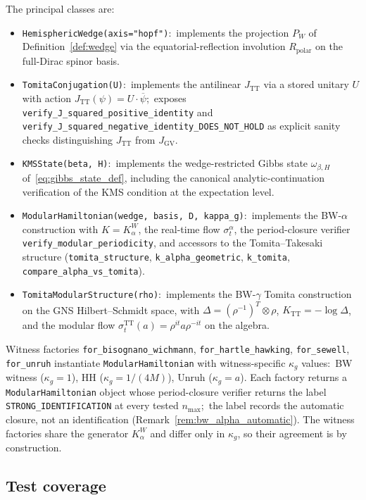 \documentclass[11pt,a4paper]{article}
\theoremstyle{plain}
\theoremstyle{definition}
\newcommand{\nmax}{n_{\max}}
\newcommand{\TT}{\mathrm{TT}}
\begin{document}
The principal classes are:
\begin{itemize}\setlength{\itemsep}{2pt}
\item \texttt{HemisphericWedge(axis="hopf")}:\ implements the projection
$P_W$ of Definition~\ref{def:wedge} via the equatorial-reflection
involution $R_{\mathrm{polar}}$ on the full-Dirac spinor basis.
\item \texttt{TomitaConjugation(U)}:\ implements the antilinear
$J_{\TT}$ via a stored unitary $U$ with action
$J_{\TT}(\psi) = U \cdot \overline{\psi}$;\ exposes
\texttt{verify\_J\_squared\_positive\_identity} and
\texttt{verify\_J\_squared\_negative\_identity\_DOES\_NOT\_HOLD} as
explicit sanity checks distinguishing $J_{\TT}$ from
$J_{\mathrm{GV}}$.
\item \texttt{KMSState(beta, H)}:\ implements the wedge-restricted
Gibbs state $\omega_{\beta, H}$ of~\eqref{eq:gibbs_state_def},
including the canonical analytic-continuation verification of the
KMS condition at the expectation level.
\item \texttt{ModularHamiltonian(wedge, basis, D, kappa\_g)}:\
implements the BW-$\alpha$ construction with $K = K_\alpha^W$, the
real-time flow $\sigma_t^{\alpha}$, the period-closure verifier
\texttt{verify\_modular\_periodicity}, and accessors to the
Tomita--Takesaki structure (\texttt{tomita\_structure},
\texttt{k\_alpha\_geometric}, \texttt{k\_tomita},
\texttt{compare\_alpha\_vs\_tomita}).
\item \texttt{TomitaModularStructure(rho)}:\ implements the
BW-$\gamma$ Tomita construction on the GNS Hilbert--Schmidt space,
with $\Delta = (\rho^{-1})^T \otimes \rho$, $K_{\TT} = -\log \Delta$,
and the modular flow $\sigma_t^{\TT}(a) = \rho^{it} a \rho^{-it}$ on
the algebra.
\end{itemize}
Witness factories \texttt{for\_bisognano\_wichmann},
\texttt{for\_hartle\_hawking}, \texttt{for\_sewell},
\texttt{for\_unruh} instantiate
\texttt{ModularHamiltonian} with witness-specific $\kappa_g$ values:\
BW witness ($\kappa_g = 1$), HH ($\kappa_g = 1/(4M)$),
Unruh ($\kappa_g = a$). Each factory returns a
\texttt{ModularHamiltonian} object whose period-closure verifier
returns the label \texttt{STRONG\_IDENTIFICATION} at every tested
$\nmax$;\ the label records the automatic closure, not an
identification (Remark~\ref{rem:bw_alpha_automatic}).  The witness
factories share the generator $K_\alpha^W$ and differ only in
$\kappa_g$, so their agreement is by construction.

\subsection{Test coverage}\label{sec:test_coverage}
\end{document}
